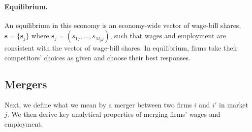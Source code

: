 \documentclass[12pt]{article}
\theoremstyle{prop}
\begin{document}
\paragraph{Equilibrium.}
An equilibrium in this economy is an economy-wide vector of wage-bill shares, $\mathbf{s} =\{\mathbf{s}_j\}$ where $\mathbf{s}_j=(s_{1j},\dots,s_{M_jj})$, such that wages and employment are consistent with the vector of wage-bill shares.
In equilibrium, firms take their competitors' choices as given and choose their best responses.

\subsection{Mergers}
Next, we define what we mean by a merger between two firms $i$ and $i'$ in market $j$. 
We then derive key analytical properties of merging firms' wages and employment.
\end{document}
